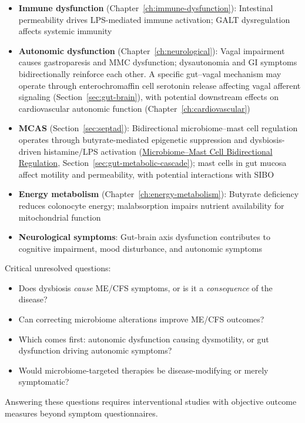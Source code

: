 \begin{itemize}
    \item \textbf{Immune dysfunction} (Chapter~\ref{ch:immune-dysfunction}): Intestinal permeability drives LPS-mediated immune activation; GALT dysregulation affects systemic immunity

    \item \textbf{Autonomic dysfunction} (Chapter~\ref{ch:neurological}): Vagal impairment causes gastroparesis and MMC dysfunction; dysautonomia and GI symptoms bidirectionally reinforce each other. A specific gut--vagal mechanism may operate through enterochromaffin cell serotonin release affecting vagal afferent signaling (Section~\ref{sec:gut-brain}), with potential downstream effects on cardiovascular autonomic function (Chapter~\ref{ch:cardiovascular})

    \item \textbf{MCAS} (Section~\ref{sec:septad}): Bidirectional microbiome--mast cell regulation operates through butyrate-mediated epigenetic suppression and dysbiosis-driven histamine/LPS activation (\hyperref[par:microbiome-mast-cell]{Microbiome--Mast Cell Bidirectional Regulation}, Section~\ref{sec:gut-metabolic-cascade}); mast cells in gut mucosa affect motility and permeability, with potential interactions with SIBO

    \item \textbf{Energy metabolism} (Chapter~\ref{ch:energy-metabolism}): Butyrate deficiency reduces colonocyte energy; malabsorption impairs nutrient availability for mitochondrial function

    \item \textbf{Neurological symptoms}: Gut-brain axis dysfunction contributes to cognitive impairment, mood disturbance, and autonomic symptoms
\end{itemize}

\begin{open_question}
\label{oq:gut-causality}
Critical unresolved questions:
\begin{itemize}
    \item Does dysbiosis \textit{cause} ME/CFS symptoms, or is it a \textit{consequence} of the disease?
    \item Can correcting microbiome alterations improve ME/CFS outcomes?
    \item Which comes first: autonomic dysfunction causing dysmotility, or gut dysfunction driving autonomic symptoms?
    \item Would microbiome-targeted therapies be disease-modifying or merely symptomatic?
\end{itemize}
Answering these questions requires interventional studies with objective outcome measures beyond symptom questionnaires.
\end{open_question}

